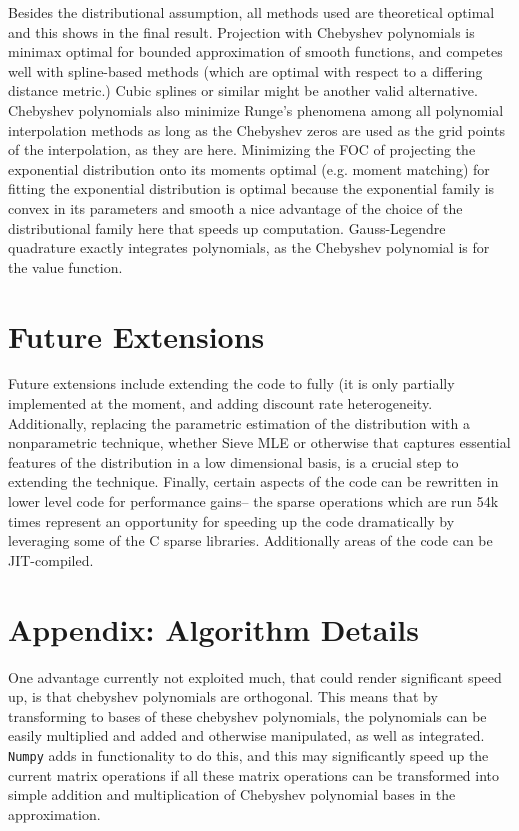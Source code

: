 \documentclass[11pt]{article}
\newcommand{\code}[1]{\texttt{#1}}
\begin{document}
\par Besides the distributional assumption, all methods used are theoretical optimal and this shows in the final result. Projection with Chebyshev polynomials is minimax optimal for bounded approximation of smooth functions, and competes well with spline-based methods (which are optimal with respect to a differing distance metric.) Cubic splines or similar might be another valid alternative.  Chebyshev polynomials also minimize Runge's phenomena among all polynomial interpolation methods as long as the Chebyshev zeros are used as the grid points of the interpolation, as they are here. Minimizing the FOC of projecting the exponential distribution onto its moments optimal (e.g. moment matching) for fitting the exponential distribution is optimal because the exponential family is convex in its parameters and smooth a nice advantage of the choice of the distributional family here that speeds up computation. Gauss-Legendre quadrature exactly integrates polynomials, as the Chebyshev polynomial is for the value function. 
\section{Future Extensions}
Future extensions include extending the code to \cite{Winberry2021} fully (it is only partially implemented at the moment, and adding discount rate heterogeneity. Additionally, replacing the parametric estimation of the distribution with a nonparametric technique, whether Sieve MLE or otherwise that captures essential features of the distribution in a low dimensional basis, is a crucial step to extending the technique. Finally, certain aspects of the code can be rewritten in lower level code for performance gains-- the sparse operations which are run 54k times represent an opportunity for speeding up the code dramatically by leveraging some of the C sparse libraries. Additionally areas of the code can be JIT-compiled. \section{Appendix: Algorithm Details} 
One advantage currently not exploited much, that could render significant speed up, is that chebyshev polynomials are orthogonal. This means that by transforming to bases of these chebyshev polynomials, the polynomials can be easily multiplied and added and otherwise manipulated, as well as integrated. \code{Numpy} adds in functionality to do this, and this may significantly speed up the current matrix operations if all these matrix operations can be transformed into simple addition and multiplication of Chebyshev polynomial bases in the approximation. 
\end{document}
